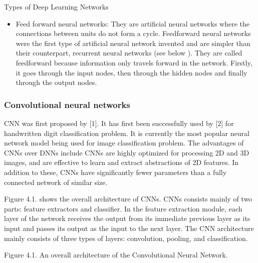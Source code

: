 \documentclass[letterpaper,10pt,english]{jupyterBook}
\begin{document}
\sphinxAtStartPar
Types of Deep Learning Networks

\sphinxAtStartPar

\begin{itemize}
\item {} 
\sphinxAtStartPar
Feed forward neural networks: They are artificial neural networks
where the connections between units do not form a cycle. Feedforward
neural networks were the first type of artificial neural network
invented and are simpler than their counterpart, recurrent neural
networks (see below ). They are called feedforward because
information only travels forward in the network.  Firstly, it goes
through the input nodes, then through the hidden nodes and finally
through the output nodes.

\end{itemize}


\subsubsection{Convolutional neural networks}
\label{\detokenize{Modelling/Neural_networks:convolutional-neural-networks}}
\sphinxAtStartPar
CNN was first proposed by {[}1{]}.  It has first been successfully used by
{[}2{]}  for handwritten digit classification problem. It is currently the
most popular neural network model being used for image classification
problem. The advantages of CNNs over DNNs include CNNs are highly
optimized for processing 2D and 3D images, and are effective to learn
and extract abstractions of 2D features. In addition to these, CNNs have
significantly fewer parameters than a fully connected network of similar
size.

\sphinxAtStartPar
Figure 4.1. shows the overall architecture of CNNs. CNNs consists mainly
of two  parts: feature extractors and classifier. In the feature
extraction module, each layer of the network receives the output from
its immediate previous layer as its input and passes its output as the
input to the next layer. The CNN architecture mainly consists of three
types of layers: convolution, pooling, and classification.

\sphinxAtStartPar
Figure 4.1. An overall architecture of the Convolutional Neural Network.
\end{document}
